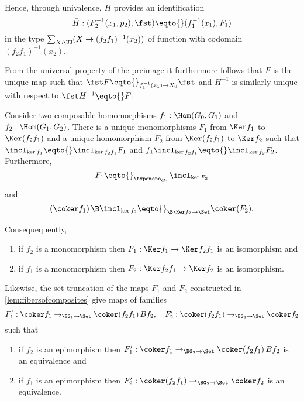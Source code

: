 Hence, through univalence, $H$ provides an identification
  $$\bar H:(F_2^{-1}(x_1,p_2),\fst)\eqto{}(f_1^{-1}(x_1),F_1)$$ in the type $\sum_{X:\UU}(X\to(f_2f_1)^{-1}(x_2))$ of function with codomain $(f_2f_1)^{-1}(x_2)$.
  
From the universal property of the preimage it furthermore follows that $F$ is the unique map such that $\fst F\eqto{}_{f_1^{-1}(x_1)\to X_0}\fst$ and $H^{-1}$ is similarly unique with respect to $\fst H^{-1}\eqto{}F$.

\begin{corollary}
  \label{cor:cokermaps}
  Consider two composable homomorphisms $f_1:\Hom(G_0,G_1)$ and $f_2:\Hom(G_1,G_2)$.
  There is a unique monomorphisms $F_1$ from $\Ker f_1$ to $\Ker(f_2f_1)$
  and a unique homomorphism $F_2$ from $\Ker(f_2f_1)$ to $\Ker f_2$ such that $\incl_{\ker f_1}\eqto{}\incl_{\ker f_2f_1}F_1$ and $f_1\incl_{\ker f_2f_1}\eqto{}\incl_{\ker f_2}F_2$.
  Furthermore, $$F_1\eqto{}_{\typemono_{G_1}}\incl_{\ker F_2}$$ and $$(\coker f_1)\,\B\incl_{\ker f_2}\eqto{}_{\B\Ker f_2\to\Set}\coker (F_2).$$

  Consequequently,
  \begin{enumerate}
  \item if $f_2$ is a monomorphism then $F_1:\Ker f_1\to\Ker f_2f_1$ is an isomorphism and
  \item if $f_1$ is a monomorphism then $F_2:\Ker f_2f_1\to\Ker f_2$ is an isomorphism.
  \end{enumerate}
Likewise, the set truncation of the maps $F_1$ and $F_2$ constructed in \cref{lem:fibersofcomposites} give maps  of families
$$F_1':\coker f_1\to_{\BG_1\to\Set}\coker(f_2f_1)\,Bf_2,\quad F_2':\coker(f_2f_1)\to_{\BG_2\to\Set}\coker f_2$$
  such that
  \begin{enumerate}
  \item if $f_2$ is an epimorphism then $F_1':\coker f_1\to_{\BG_2\to\Set}\coker(f_2f_1)\,Bf_2$ is an equivalence and
  \item if $f_1$ is an epimorphism then $F_2':\coker(f_2f_1)\to_{\BG_2\to\Set}\coker f_2$  is an equivalence.
  \end{enumerate}
\end{corollary}
